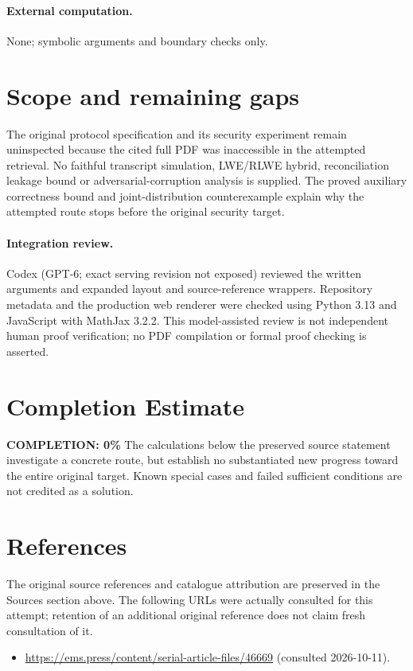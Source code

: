 \documentclass[11pt]{article}
\begin{document}
\paragraph{External computation.} None; symbolic arguments and boundary checks only.
\section{Scope and remaining gaps}
The original protocol specification and its security experiment remain uninspected because the cited full PDF was inaccessible in the attempted retrieval. No faithful transcript simulation, LWE/RLWE hybrid, reconciliation leakage bound or adversarial-corruption analysis is supplied. The proved auxiliary correctness bound and joint-distribution counterexample explain why the attempted route stops before the original security target.
\paragraph{Integration review.} Codex (GPT-6; exact serving revision not exposed) reviewed the written arguments and expanded layout and source-reference wrappers. Repository metadata and the production web renderer were checked using Python 3.13 and JavaScript with MathJax 3.2.2. This model-assisted review is not independent human proof verification; no PDF compilation or formal proof checking is asserted.

\section{Completion Estimate}
\noindent\textbf{COMPLETION: 0\%}
The calculations below the preserved source statement investigate a concrete route,
but establish no substantiated new progress toward the entire original target.
Known special cases and failed sufficient conditions are not credited as a solution.
\section{References}
The original source references and catalogue attribution are preserved in the
Sources section above. The following URLs were actually consulted for this attempt;
retention of an additional original reference does not claim fresh consultation of it.
\begin{itemize}
\item \url{https://ems.press/content/serial-article-files/46669} (consulted 2026-10-11). 
\end{itemize}
\end{document}
